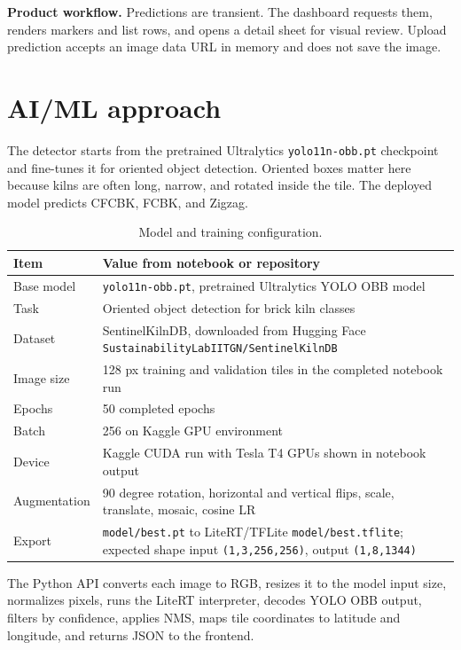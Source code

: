 \documentclass[10pt]{article}
\begin{document}
\textbf{Product workflow.} Predictions are transient. The dashboard requests them, renders markers and list rows, and opens a detail sheet for visual review. Upload prediction accepts an image data URL in memory and does not save the image.

\section{AI/ML approach}
The detector starts from the pretrained Ultralytics \texttt{yolo11n-obb.pt} checkpoint and fine-tunes it for oriented object detection. Oriented boxes matter here because kilns are often long, narrow, and rotated inside the tile. The deployed model predicts CFCBK, FCBK, and Zigzag.

\begin{table}[H]
  \centering
  \small
  \begin{tabularx}{\linewidth}{@{}lX@{}}
    \toprule
    Item & Value from notebook or repository \\
    \midrule
    Base model & \texttt{yolo11n-obb.pt}, pretrained Ultralytics YOLO OBB model \\
    Task & Oriented object detection for brick kiln classes \\
    Dataset & SentinelKilnDB, downloaded from Hugging Face \texttt{SustainabilityLabIITGN/SentinelKilnDB} \\
    Image size & 128 px training and validation tiles in the completed notebook run \\
    Epochs & 50 completed epochs \\
    Batch & 256 on Kaggle GPU environment \\
    Device & Kaggle CUDA run with Tesla T4 GPUs shown in notebook output \\
    Augmentation & 90 degree rotation, horizontal and vertical flips, scale, translate, mosaic, cosine LR \\
    Export & \texttt{model/best.pt} to LiteRT/TFLite \texttt{model/best.tflite}; expected shape input \texttt{(1,3,256,256)}, output \texttt{(1,8,1344)} \\
    \bottomrule
  \end{tabularx}
  \caption{Model and training configuration.}
\end{table}

The Python API converts each image to RGB, resizes it to the model input size, normalizes pixels, runs the LiteRT interpreter, decodes YOLO OBB output, filters by confidence, applies NMS, maps tile coordinates to latitude and longitude, and returns JSON to the frontend.
\end{document}
